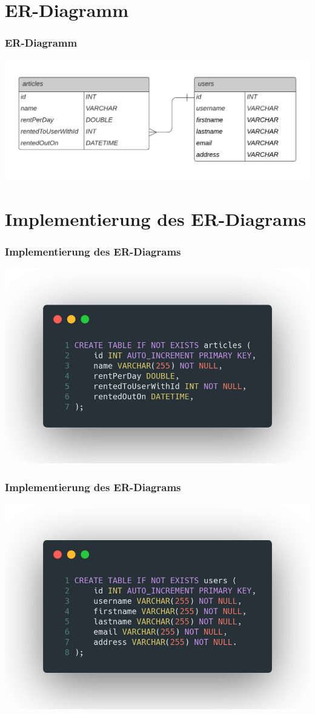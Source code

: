 \documentclass[aspectratio=169]{beamer}
\begin{document}
\section{ER-Diagramm}
\begin{frame}
	\frametitle{ER-Diagramm}
	\includegraphics[width=\textwidth]{presentation/image06}
\end{frame}

\section{Implementierung des ER-Diagrams}
\begin{frame}
	\frametitle{Implementierung des ER-Diagrams}
	\includegraphics[width=\textwidth]{presentation/image07}
\end{frame}

\begin{frame}
	\frametitle{Implementierung des ER-Diagrams}
	\includegraphics[width=\textwidth]{presentation/image08}
\end{frame}
\end{document}
